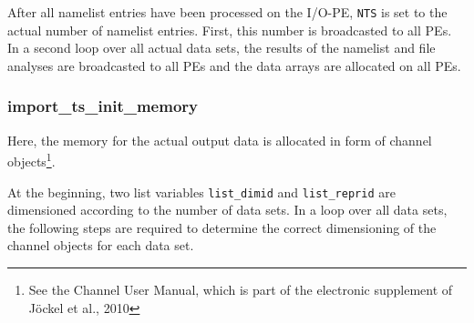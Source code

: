\documentclass[11pt,twoside]{report}
\begin{document}
After all namelist entries have been processed on the I/O-PE, \verb|NTS|
is set to the actual number of namelist entries. First, this number is 
broadcasted to all PEs. In a second loop over all actual data sets, the 
results of the namelist and file analyses are broadcasted to all PEs and
the data arrays are allocated on all PEs.

\subsubsection{import\_ts\_init\_memory}
Here, the memory for the actual output data is allocated in form of channel
objects\footnote{See the Channel User Manual, which is part of the electronic supplement of J\"ockel et al., 2010}.

At the beginning, two list variables \verb|list_dimid|
 and \verb|list_reprid| 
 are dimensioned according to the number of data sets. 
In a loop over all data sets, the following steps are required to
 determine the correct dimensioning of the channel objects for each
 data set.
\end{document}

